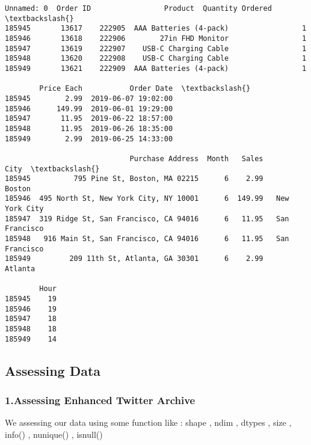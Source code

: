 \documentclass[11pt]{article}
\makeatletter
\newcommand{\boxspacing}{\kern\kvtcb@left@rule\kern\kvtcb@boxsep}
\newcommand{\prompt}[4]{
        {\ttfamily\llap{{\color{#2}[#3]:\hspace{3pt}#4}}\vspace{-\baselineskip}}
    }
\makeatother
\begin{document}
            \begin{tcolorbox}[breakable, size=fbox, boxrule=.5pt, pad at break*=1mm, opacityfill=0]
\prompt{Out}{outcolor}{4}{\boxspacing}
\begin{Verbatim}[commandchars=\\\{\}]
        Unnamed: 0  Order ID                 Product  Quantity Ordered  \textbackslash{}
185945       13617    222905  AAA Batteries (4-pack)                 1
185946       13618    222906        27in FHD Monitor                 1
185947       13619    222907    USB-C Charging Cable                 1
185948       13620    222908    USB-C Charging Cable                 1
185949       13621    222909  AAA Batteries (4-pack)                 1

        Price Each           Order Date  \textbackslash{}
185945        2.99  2019-06-07 19:02:00
185946      149.99  2019-06-01 19:29:00
185947       11.95  2019-06-22 18:57:00
185948       11.95  2019-06-26 18:35:00
185949        2.99  2019-06-25 14:33:00

                             Purchase Address  Month   Sales            City  \textbackslash{}
185945          795 Pine St, Boston, MA 02215      6    2.99          Boston
185946  495 North St, New York City, NY 10001      6  149.99   New York City
185947  319 Ridge St, San Francisco, CA 94016      6   11.95   San Francisco
185948   916 Main St, San Francisco, CA 94016      6   11.95   San Francisco
185949         209 11th St, Atlanta, GA 30301      6    2.99         Atlanta

        Hour
185945    19
185946    19
185947    18
185948    18
185949    14
\end{Verbatim}
\end{tcolorbox}
        
    \hypertarget{assessing-data}{%
\subsection{Assessing Data}\label{assessing-data}}

    \hypertarget{assessing-enhanced-twitter-archive}{%
\subsubsection{1.Assessing Enhanced Twitter
Archive}\label{assessing-enhanced-twitter-archive}}

    We assessing our data using some function like : shape , ndim , dtypes ,
size , info() , nunique() , isnull()
\end{document}

